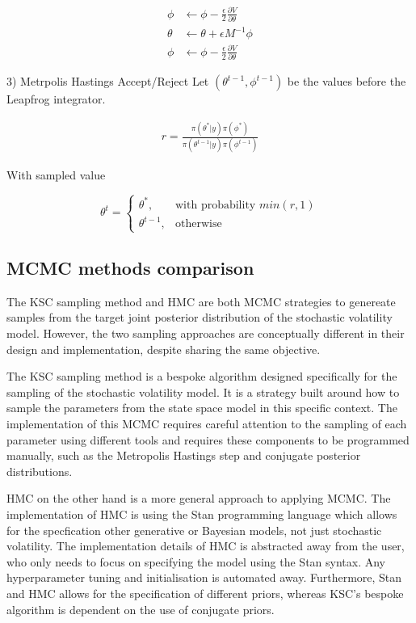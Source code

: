 \documentclass[12pt, a4paper]{article}
\begin{document}
        $$
        \begin{aligned}
        \phi &\leftarrow \phi - \frac{\epsilon}{2} \frac{\partial V}{\partial \theta} \\
        \theta &\leftarrow \theta + \epsilon M^{-1} \phi \\
        \phi &\leftarrow \phi - \frac{\epsilon}{2} \frac{\partial V}{\partial \theta}
        \end{aligned}
        $$

        3) Metrpolis Hastings Accept/Reject
        Let $(\theta^{t-1}, \phi^{t-1})$ be the values before the Leapfrog integrator.

        $$
        \begin{aligned}
        r = \frac{\pi(\theta^{\ast} | y) \pi(\phi^{\ast})}{\pi(\theta^{t-1} | y) \pi(\phi^{t-1})}
        \end{aligned}
        $$

        With sampled value

        $$
        \theta^t = \begin{cases}
            \theta^{\ast},& \text{with probability } min(r,1)\\
            \theta^{t-1}, & \text{otherwise}
        \end{cases}
        $$

    \subsection{MCMC methods comparison}
        The KSC sampling method and HMC are both MCMC strategies to genereate samples from the target joint posterior distribution of the stochastic volatility model. However, the two sampling approaches are conceptually different in their design and implementation, despite sharing the same objective.
        
        The KSC sampling method is a bespoke algorithm designed specifically for the sampling of the stochastic volatility model. It is a strategy built around how to sample the parameters from the state space model in this specific context. The implementation of this MCMC requires careful attention to the sampling of each parameter using different tools and requires these components to be programmed manually, such as the Metropolis Hastings step and conjugate posterior distributions. 
    
        HMC on the other hand is a more general approach to applying MCMC. The implementation of HMC is using the Stan programming language which allows for the specfication other generative or Bayesian models, not just stochastic volatility. The implementation details of HMC is abstracted away from the user, who only needs to focus on specifying the model using the Stan syntax. Any hyperparameter tuning and initialisation is automated away. Furthermore, Stan and HMC allows for the specification of different priors, whereas KSC's bespoke algorithm is dependent on the use of conjugate priors. 
\end{document}
